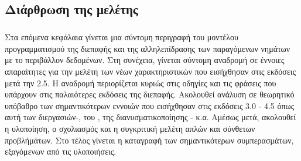 \newpage
\subsection{Διάρθρωση της μελέτης}
\subparagraph{}
Στα επόμενα κεφάλαια γίνεται μια σύντομη περιγραφή του μοντέλου προγραμματισμού της διεπαφής
\emph{} και της αλληλεπίδρασης των παραγόμενων νημάτων με το περιβάλλον δεδομένων.
Στη συνέχεια, γίνεται σύντομη αναδρομή σε έννοιες απαραίτητες για την μελέτη των νέων χαρακτηριστικών που
εισήχθησαν στις εκδόσεις μετά την 2.5. Η αναδρομή περιορίζεται κυριώς στις οδηγίες και τις
φράσεις που υπάρχουν στις παλαιότερες εκδόσεις της διεπαφής. Ακολουθεί ανάλυση σε
θεωρητικό υπόβαθρο των σημαντικότερων εννοιών που εισήχθησαν στις εκδόσεις 3.0 - 4.5 όπως αυτή των
διεργασιών-\emph{}, του \emph{}, της διανυσματικοποίησης
-\emph{} κ.α. Αμέσως μετά, ακολουθεί η υλοποίηση, ο σχολιασμός και η συγκριτική
μελέτη απλών και σύνθετων προβλήμάτων. Στο τέλος γίνεται η καταγραφή των σημαντικότερων
συμπερασμάτων, εξαγόμενων από τις υλοποιήσεις.